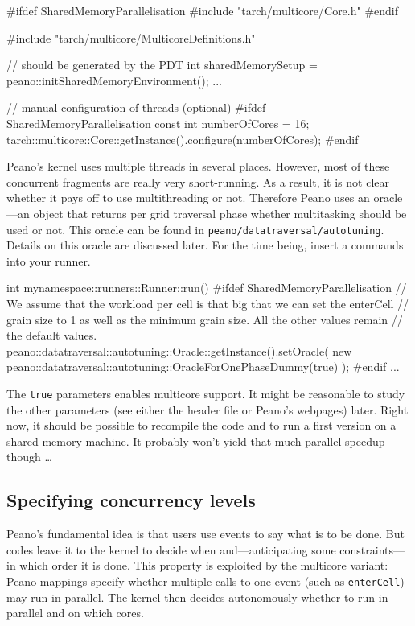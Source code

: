 \begin{code}
#ifdef SharedMemoryParallelisation
#include "tarch/multicore/Core.h"
#endif

#include "tarch/multicore/MulticoreDefinitions.h"

  // should be generated by the PDT
  int sharedMemorySetup = peano::initSharedMemoryEnvironment();
  ...


  // manual configuration of threads (optional)
  #ifdef SharedMemoryParallelisation
  const int         numberOfCores    = 16;
  tarch::multicore::Core::getInstance().configure(numberOfCores);
  #endif

\end{code}

\noindent
Peano's kernel uses multiple threads in several places. 
However, most of these concurrent fragments are really very short-running.
As a result, it is not clear whether it pays off to use multithreading or not.
Therefore Peano uses an oracle---an object that returns per grid
traversal phase whether multitasking should be used or not.
This oracle can be found in \texttt{peano/datatraversal/autotuning}. 
Details on this oracle are discussed later.
For the time being, insert a commands into your runner.

\begin{code}
int mynamespace::runners::Runner::run() {
  #ifdef SharedMemoryParallelisation
  // We assume that the workload per cell is that big that we can set the enterCell
  // grain size to 1 as well as the minimum grain size. All the other values remain
  // the default values.
  peano::datatraversal::autotuning::Oracle::getInstance().setOracle(
    new peano::datatraversal::autotuning::OracleForOnePhaseDummy(true)
  );
  #endif
  ...
}
\end{code}

\noindent
The \texttt{true} parameters enables multicore support.
It might be reasonable to study the other parameters (see either the header
file or Peano's webpages) later.
Right now, it should be possible to recompile the code and to run a first
version on a shared memory machine.
It probably won't yield that much parallel speedup though \ldots


\subsection{Specifying concurrency levels}

Peano's fundamental idea is that users use events to say what is to be done. 
But codes leave it to the kernel to decide when and---anticipating some
constraints---in which order it is done.
This property is exploited by the multicore variant: 
Peano mappings specify whether multiple calls to one event (such as
\texttt{enterCell}) may run in parallel.
The kernel then decides autonomously whether to run in parallel and on which
cores.


